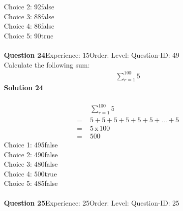 \documentclass{article}
\begin{document}
Choice 2: \hspace{20pt}92\hspace{20pt}false\\
Choice 3: \hspace{20pt}88\hspace{20pt}false\\
Choice 4: \hspace{20pt}86\hspace{20pt}false\\
Choice 5: \hspace{20pt}90\hspace{20pt}true\\
\\[4pt]
\noindent\textbf{Question 24}\hspace{20pt}Experience: 15\hspace{20pt}Order: \hspace{20pt}Level: \hspace{20pt}Question-ID: 49\\[2pt]
Calculate the following sum:
\begin{align*}
\sum_{r=1}^{100} 5
\end{align*}
\noindent\textbf{Solution 24}\\[2pt]
\\[-35pt]\begin{align*}
&\sum_{r=1}^{100} 5\\[2pt]
=\,\,&5+5+5+5+5+5+...+5\\[2pt]
=\,\,&5 \, \text{x} \, 100\\[2pt]
=\,\,&500
\end{align*}
Choice 1: \hspace{20pt}495\hspace{20pt}false\\
Choice 2: \hspace{20pt}490\hspace{20pt}false\\
Choice 3: \hspace{20pt}480\hspace{20pt}false\\
Choice 4: \hspace{20pt}500\hspace{20pt}true\\
Choice 5: \hspace{20pt}485\hspace{20pt}false\\
\\[4pt]
\noindent\textbf{Question 25}\hspace{20pt}Experience: 25\hspace{20pt}Order: \hspace{20pt}Level: \hspace{20pt}Question-ID: 25\\[2pt]
\end{document}
